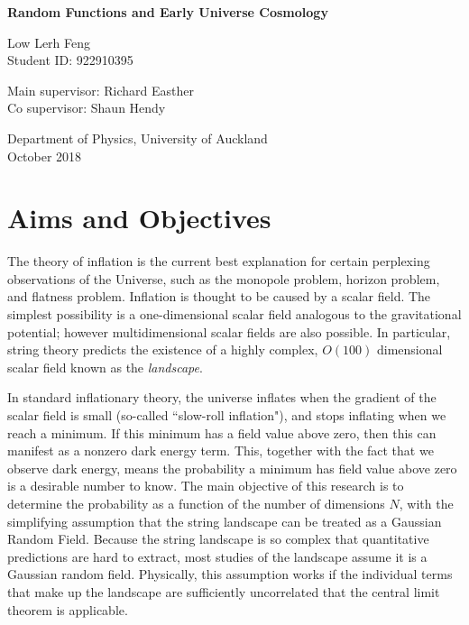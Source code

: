 \documentclass[12pt]{article}
\begin{document}
\begin{titlepage}
    \begin{center}
	\vspace*{1cm}
 
	\Huge
	\textbf{Random Functions and Early Universe Cosmology}
 
	\vspace{0.5cm}
	\Large
 
	\vspace{1.5cm}
 
	Low Lerh Feng \\
	Student ID: 922910395
 
	\vfill
 
	Main supervisor: Richard Easther\\
	Co supervisor: Shaun Hendy
 
	\vspace{0.8cm}
 	Department of Physics, University of Auckland\\
	October 2018
    \end{center}
\end{titlepage}

\section{Aims and Objectives}

The theory of inflation is the current best explanation for certain perplexing observations of the Universe, such as the monopole problem, horizon problem, and flatness problem. Inflation is thought to be caused by a scalar field. The simplest possibility is a one-dimensional scalar field analogous to the gravitational potential; however multidimensional scalar fields are also possible. In particular, string theory predicts the existence of a highly complex, $O(100)$ dimensional scalar field known as the \emph{landscape}. 

In standard inflationary theory, the universe inflates when the gradient of the scalar field is small (so-called ``slow-roll inflation"), and stops inflating when we reach a minimum. If this minimum has a field value above zero, then this can manifest as a nonzero dark energy term. This, together with the fact that we observe dark energy, means the probability a minimum has field value above zero is a desirable number to know. The main objective of this research is to determine the probability as a function of the number of dimensions $N$, with the simplifying assumption that the string landscape can be treated as a Gaussian Random Field. Because the string landscape is so complex that quantitative predictions are hard to extract, most studies of the landscape assume it is a Gaussian random field.\cite{GRF1, GRF2, GRF3} Physically, this assumption works if the individual terms that make up the landscape are sufficiently uncorrelated that the central limit theorem is applicable.
\end{document}
